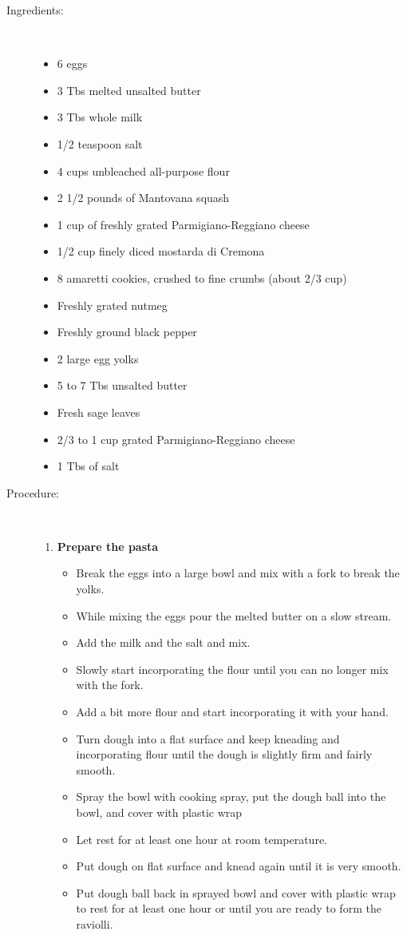 \documentclass[11pt,letterpaper]{article}
\begin{document}
\begin{description}

\item[Ingredients:]\ \\
	\begin{itemize}
	\item 6 eggs
	\item 3 Tbs melted unsalted butter
	\item 3 Tbs whole milk
	\item 1/2 teaspoon salt
	\item 4 cups unbleached all-purpose flour
	\item	2 1/2 pounds of Mantovana squash
	\item 1 cup of freshly grated Parmigiano-Reggiano cheese
	\item 1/2 cup finely diced mostarda di Cremona
	\item 8 amaretti cookies, crushed to fine crumbs (about 2/3 cup)
	\item Freshly grated nutmeg
	\item Freshly ground black pepper
	\item 2 large egg yolks
	\item 5 to 7 Tbs unsalted butter
	\item Fresh sage leaves
	\item 2/3 to 1 cup grated Parmigiano-Reggiano cheese
	\item 1 Tbs of salt
	\end{itemize}

\item[Procedure:]\ \\

	\begin{enumerate}
	\item {\bf Prepare the pasta}
	\begin{itemize}
	\item Break the eggs into a large bowl and mix with a fork to break the yolks.
	\item While mixing the eggs pour the melted butter on a slow stream.
	\item Add the milk and the salt and mix.
	\item Slowly start incorporating the flour until you can no longer mix with the fork.
	\item Add a bit more flour and start incorporating it with your hand.
	\item Turn dough into a flat surface and keep kneading and incorporating flour until the dough is slightly firm and fairly smooth.
	\item Spray the bowl with cooking spray, put the dough ball into the bowl, and cover with plastic wrap
	\item Let rest for at least one hour at room temperature.
	\item Put dough on flat surface and knead again until it is very smooth.
	\item Put dough ball back in sprayed bowl and cover with plastic wrap to rest for at least one hour or until you are ready to form the raviolli.
	\end{itemize}


\end{enumerate}
\end{description}
\end{document}
